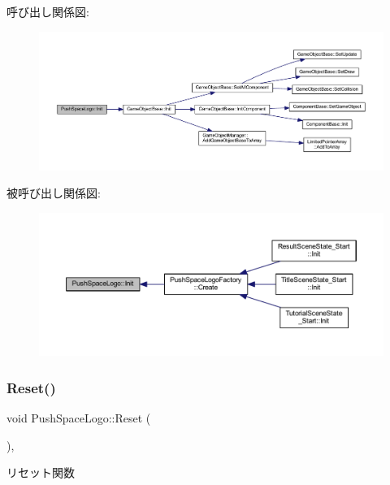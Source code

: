 呼び出し関係図\+:\nopagebreak
\begin{figure}[H]
\begin{center}
\leavevmode
\includegraphics[width=350pt]{class_push_space_logo_a381d34d0dfdd493eb46f299d2a2ba858_cgraph}
\end{center}
\end{figure}
被呼び出し関係図\+:\nopagebreak
\begin{figure}[H]
\begin{center}
\leavevmode
\includegraphics[width=350pt]{class_push_space_logo_a381d34d0dfdd493eb46f299d2a2ba858_icgraph}
\end{center}
\end{figure}
\mbox{\label{class_push_space_logo_afa163b1aff8df494b4f09f378bf983f0}} 
\subsubsection{\texorpdfstring{Reset()}{Reset()}}
{\footnotesize\ttfamily void Push\+Space\+Logo\+::\+Reset (\begin{DoxyParamCaption}{ }\end{DoxyParamCaption})\hspace{0.3cm}{\ttfamily [override]}, {\ttfamily [virtual]}}



リセット関数 



